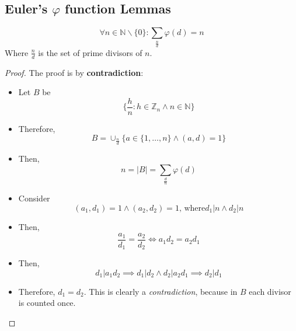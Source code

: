 \subsection{Euler's $\varphi$ function Lemmas}
\begin{lemma}
    \[\forall n \in \mathbb{N} \backslash \{0\}: \sum_{\frac{n}{d}} \varphi(d) = n\]
    Where $\frac{n}{d}$ is the set of prime divisors of $n$.\newline
\end{lemma}
\begin{proof}
    The proof is by \textbf{contradiction}:
    \begin{itemize}
        \item Let $B$ be \[\{\frac{h}{n}: h \in \mathbb{Z}_{n} \land n \in \mathbb{N} \}\]
        \item Therefore, \[B = \cup_{\frac{n}{d}}\{a \in \{1, \dots, n\} \land (a,d) = 1\}\]
        \item Then, \[n = |B| = \sum_{\frac{d}{n}} \varphi(d)\]
        \item Consider \[(a_{1}, d_{1}) = 1 \land (a_{2}, d_{2}) = 1 \text{, where} d_{1}|n \land d_{2}|n\]
        \item Then, \[\frac{a_{1}}{d_{1}} = \frac{a_{2}}{d_{2}} \iff a_{1}d_{2} = a_{2}d_{1}\]
        \item Then, \[d_{1}|a_{1}d_{2} \implies d_{1}|d_{2} \land
        d_{2}|a_{2}d_{1} \implies d_{2}|d_{1}\]
        \item Therefore,  $d_{1} = d_{2}$. This is clearly a \emph{contradiction}, because in $B$ each divisor is counted once.
    \end{itemize}
\end{proof}

